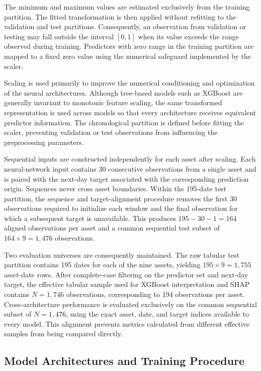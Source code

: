 \documentclass[utf8]{FrontiersinHarvard} %
\begin{document}
The minimum and maximum values are estimated exclusively from the training partition. The fitted transformation is then applied without refitting to the validation and test partitions. Consequently, an observation from validation or testing may fall outside the interval \([0,1]\) when its value exceeds the range observed during training. Predictors with zero range in the training partition are mapped to a fixed zero value using the numerical safeguard implemented by the scaler.

Scaling is used primarily to improve the numerical conditioning and optimization of the neural architectures. Although tree-based models such as XGBoost are generally invariant to monotonic feature scaling, the same transformed representation is used across models so that every architecture receives equivalent predictor information. The chronological partition is defined before fitting the scaler, preventing validation or test observations from influencing the preprocessing parameters.

Sequential inputs are constructed independently for each asset after scaling. Each neural-network input contains 30 consecutive observations from a single asset and is paired with the next-day target associated with the corresponding prediction origin. Sequences never cross asset boundaries. Within the 195-date test partition, the sequence and target-alignment procedure removes the first 30 observations required to initialize each window and the final observation for which a subsequent target is unavailable. This produces \(195-30-1=164\) aligned observations per asset and a common sequential test subset of \(164\times9=1{,}476\) observations.

Two evaluation universes are consequently maintained. The raw tabular test partition contains 195 dates for each of the nine assets, yielding \(195\times9=1{,}755\) asset-date rows. After complete-case filtering on the predictor set and next-day target, the effective tabular sample used for XGBoost interpretation and SHAP contains \(N=1{,}746\) observations, corresponding to 194 observations per asset. Cross-architecture performance is evaluated exclusively on the common sequential subset of \(N=1{,}476\), using the exact asset, date, and target indices available to every model. This alignment prevents metrics calculated from different effective samples from being compared directly.

\subsection{Model Architectures and Training Procedure}
\label{subsec:model_architectures}
\end{document}
